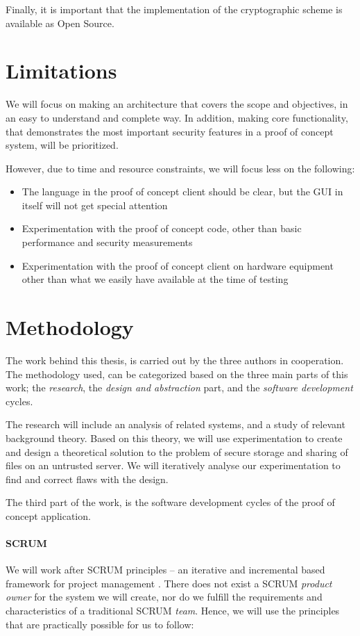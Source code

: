 \documentclass[pdftex,english,10pt,b5paper,twoside]{book}
\begin{document}
Finally, it is important that the implementation of the cryptographic scheme
is available as Open Source.

\section{Limitations}

We will focus on making an architecture that covers the scope and objectives,
in an easy to understand and complete way. In addition, making core
functionality, that demonstrates the most important security features in a proof
of concept system, will be prioritized.

However, due to time and resource constraints, we will focus less on the following:
\begin{itemize}
  \item The language in the proof of concept client should be clear, but the
    \ac{GUI} in itself will not get special attention
  \item Experimentation with the proof of concept code, other
    than basic performance and security measurements
  \item Experimentation with the proof of concept client on hardware equipment
    other than what we easily have available at the time of testing
\end{itemize}

\section{Methodology}

The work behind this thesis, is carried out by the three authors in
cooperation. The methodology used, can be categorized based on the three main
parts of this work; the \emph{research}, the \emph{design and abstraction}
part, and the \emph{software development} cycles.

The research will include an analysis of related systems, and a study of
relevant background theory. Based on this theory, we will use experimentation
to create and design a theoretical solution to the problem of secure storage
and sharing of files on an untrusted server. We will iteratively analyse our
experimentation to find and correct flaws with the design.

The third part of the work, is the software development cycles of the proof of
concept application.

\paragraph{SCRUM} We will work after SCRUM principles -- an iterative and
incremental based framework for project management \cite{scrum}. There does not
exist a SCRUM \emph{product owner} for the system we will create, nor do we
fulfill the requirements and characteristics \cite{scrum} of a traditional
SCRUM \emph{team}. Hence, we will use the principles that are practically
possible for us to follow:
\end{document}
